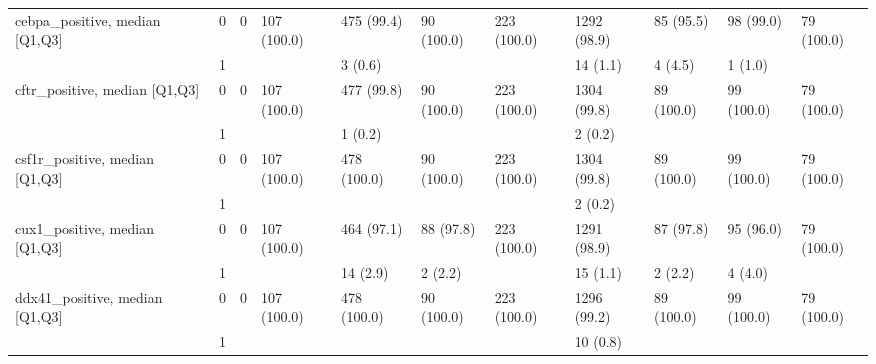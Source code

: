 \begin{tabular}{lllllllllll}
cebpa\_positive, median [Q1,Q3] & 0 &                    0 &         107 (100.0) &         475 (99.4) &           90 (100.0) &         223 (100.0) &       1292 (98.9) &         85 (95.5) &           98 (99.0) &           79 (100.0) \\
                 & 1 &                      &                     &            3 (0.6) &                      &                     &          14 (1.1) &           4 (4.5) &             1 (1.0) &                      \\
cftr\_positive, median [Q1,Q3] & 0 &                    0 &         107 (100.0) &         477 (99.8) &           90 (100.0) &         223 (100.0) &       1304 (99.8) &        89 (100.0) &          99 (100.0) &           79 (100.0) \\
                 & 1 &                      &                     &            1 (0.2) &                      &                     &           2 (0.2) &                   &                     &                      \\
csf1r\_positive, median [Q1,Q3] & 0 &                    0 &         107 (100.0) &        478 (100.0) &           90 (100.0) &         223 (100.0) &       1304 (99.8) &        89 (100.0) &          99 (100.0) &           79 (100.0) \\
                 & 1 &                      &                     &                    &                      &                     &           2 (0.2) &                   &                     &                      \\
cux1\_positive, median [Q1,Q3] & 0 &                    0 &         107 (100.0) &         464 (97.1) &            88 (97.8) &         223 (100.0) &       1291 (98.9) &         87 (97.8) &           95 (96.0) &           79 (100.0) \\
                 & 1 &                      &                     &           14 (2.9) &              2 (2.2) &                     &          15 (1.1) &           2 (2.2) &             4 (4.0) &                      \\
ddx41\_positive, median [Q1,Q3] & 0 &                    0 &         107 (100.0) &        478 (100.0) &           90 (100.0) &         223 (100.0) &       1296 (99.2) &        89 (100.0) &          99 (100.0) &           79 (100.0) \\
                 & 1 &                      &                     &                    &                      &                     &          10 (0.8) &                   &                     &                      \\

\end{tabular}
